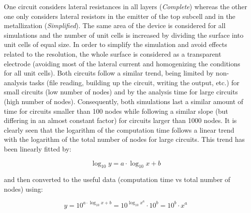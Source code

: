 One circuit considers lateral resistances in all layers (\textit{Complete}) whereas the other one only considers lateral resistors in the emitter of the top subcell and in the metallization (\textit{Simplified}). The same area of the device is considered for all simulations and the number of unit cells is increased by dividing the surface into unit cells of equal size. In order to simplify the simulation and avoid effects related to the resolution, the whole surface is considered as a transparent electrode (avoiding most of the lateral current and homogenizing the conditions for all unit cells). Both circuits follow a similar trend, being limited by non-analysis tasks (file reading, building up the circuit, writing the output, etc.) for small circuits (low number of nodes) and by the analysis time for large circuits (high number of nodes). Consequently, both simulations last a similar amount of time for circuits smaller than 100 nodes while following a similar slope (but differing in an almost constant factor) for circuits larger than 1000 nodes. It is clearly seen that the logarithm of the computation time follows a linear trend with the logarithm of the total number of nodes for large circuits. This trend has been linearly fitted by:

\begin{equation}\label{eq:AppA_Log2LinA}
	\log_{10}y = a \cdot \log_{10}x + b
\end{equation}

and then converted to the useful data (computation time vs total number of nodes) using:

\begin{equation}\label{eq:AppA_Log2LinB}
	y = 10^{a \cdot \log_{10}x + b} = 10^{\log_{10}x^a} \cdot 10^{b} =10^{b} \cdot x^a
\end{equation}

